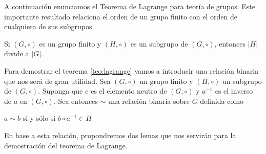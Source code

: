A continuación enunciamos el Teorema de Lagrange para teoría de grupos. Este importante resultado relaciona el orden de un grupo finito con el orden de cualquiera de sus subgrupos.
\begin{theorem}[{\bf Lagrange}]
\label{teo:lagrange}
Si $(G, \circ)$ es un grupo finito y $(H, \circ)$ es un subgrupo de $(G, \circ)$, entonces $|H|$ divide a $|G|$.
\end{theorem}

Para demostrar el teorema \ref{teo:lagrange} vamos a introducir una relación binaria que nos será de gran utilidad. Sea $(G, \circ)$ un grupo finito y $(H, \circ)$ un subgrupo de $(G, \circ)$. 
Suponga que $e$ es el elemento neutro de $(G,\circ)$ y $a^{-1}$ es el inverso de $a$ en $(G, \circ)$.
Sea entonces $\sim$ una relación binaria sobre $G$ definida
como 
\begin{center}
	$a \sim b$ si y sólo si $b \circ a^{-1} \in H$
\end{center}
En base a esta relación, propondremos dos lemas que nos servirán para la demostración del teorema de Lagrange.

